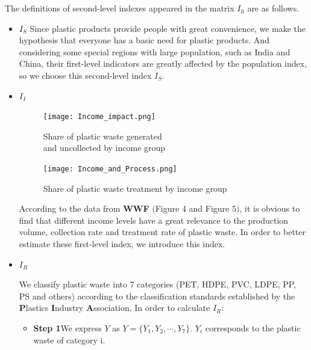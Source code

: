 \documentclass{mcmthesis}
\begin{document}
   The definitions of second-level indexes appeared in the matrix \textbf{$I_{\textrm{ii}}$} are as follows.
   \begin{itemize}
		\item$I_S$
			Since plastic products provide people with great convenience, we make the hypothesis that everyone has a basic need for plastic products. And considering some special regions with large population, such as India and China, their first-level indicators are   greatly affected by the population index, so we choose this second-level index $I_S$.
		\item$I_I$ 
	 
		\begin{figure} [H]
			\begin{minipage}[t]{0.5\linewidth} 
			\centering 
			\texttt{[image: Income\_impact.png]} 
			\caption{Share of plastic waste generated\\and uncollected by income group} 
			\label{frame} 
			\end{minipage}%
			\begin{minipage}[t]{0.5\linewidth} 
			\centering 
			\texttt{[image: Income\_and\_Process.png]} 
			\caption{Share of plastic waste treatment by income group} 
			\label{label} 
			\end{minipage} 
		\end{figure}


	   \begin{spacing}{0.5}
	   \hspace*{\fill}
	   \end{spacing}
	   According to the data from \textbf{WWF} $($Figure 4 and Figure 5$)$, it is obvious to find that different income levels have a great relevance to the production volume, collection rate and treatment rate of plastic waste. In order to better estimate these first-level index, we introduce this index.
		 

		\item$I_R$

		We classify plastic waste into 7 categories (PET, HDPE, PVC, LDPE, PP, PS and others) according to the classification standards established by the \textbf{P}lastics \textbf{I}ndustry \textbf{A}ssociation. In order to calculate $I_R$:
	 \begin{itemize}
	   
	   \item \textbf{Step 1}\quad We express $Y$ as $Y=\{ Y_1,Y_2,\cdots,Y_7\}$. $Y_i$ corresponds to the plastic waste of category i.
	   

\end{itemize}
\end{itemize}
\end{document}
